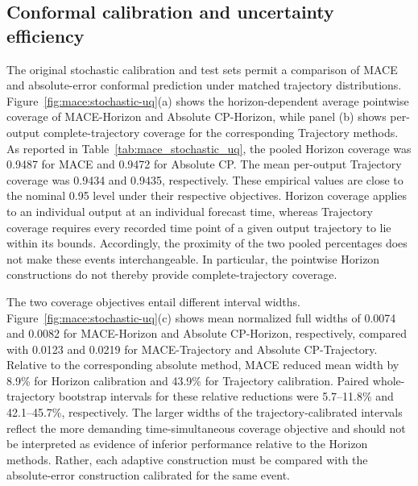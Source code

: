\subsection{Conformal calibration and uncertainty efficiency}
\label{sec:results:stochastic-uq}

The original stochastic calibration and test sets permit a comparison of MACE and absolute-error conformal prediction under matched trajectory distributions. Figure~\ref{fig:mace:stochastic-uq}(a) shows the horizon-dependent average pointwise coverage of MACE-Horizon and Absolute CP-Horizon, while panel (b) shows per-output complete-trajectory coverage for the corresponding Trajectory methods. As reported in Table~\ref{tab:mace_stochastic_uq}, the pooled Horizon coverage was 0.9487 for MACE and 0.9472 for Absolute CP. The mean per-output Trajectory coverage was 0.9434 and 0.9435, respectively. These empirical values are close to the nominal 0.95 level under their respective objectives. Horizon coverage applies to an individual output at an individual forecast time, whereas Trajectory coverage requires every recorded time point of a given output trajectory to lie within its bounds. Accordingly, the proximity of the two pooled percentages does not make these events interchangeable. In particular, the pointwise Horizon constructions do not thereby provide complete-trajectory coverage.

The two coverage objectives entail different interval widths. Figure~\ref{fig:mace:stochastic-uq}(c) shows mean normalized full widths of 0.0074 and 0.0082 for MACE-Horizon and Absolute CP-Horizon, respectively, compared with 0.0123 and 0.0219 for MACE-Trajectory and Absolute CP-Trajectory. Relative to the corresponding absolute method, MACE reduced mean width by 8.9\% for Horizon calibration and 43.9\% for Trajectory calibration. Paired whole-trajectory bootstrap intervals for these relative reductions were 5.7--11.8\% and 42.1--45.7\%, respectively. The larger widths of the trajectory-calibrated intervals reflect the more demanding time-simultaneous coverage objective and should not be interpreted as evidence of inferior performance relative to the Horizon methods. Rather, each adaptive construction must be compared with the absolute-error construction calibrated for the same event.

